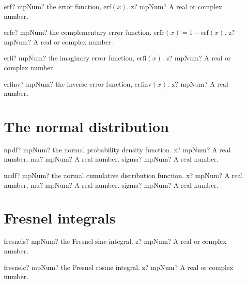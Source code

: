 \documentclass[12pt,a4paper,openany]{book}
\begin{document}
\begin{mpFunctionsExtract}
\mpFunctionOne
{erf? mpNum? the error function, $\text{erf}(x)$.}
{z? mpNum? A real or complex number.}
\end{mpFunctionsExtract}

\begin{mpFunctionsExtract}
\mpFunctionOne
{erfc? mpNum? the complementary error function, $\text{erfc}(x)=1-\text{erf}(x)$.}
{z? mpNum? A real or complex number.}
\end{mpFunctionsExtract}

\begin{mpFunctionsExtract}
\mpFunctionOne
{erfi? mpNum? the imaginary error function, $\text{erfi}(x)$.}
{z? mpNum? A real or complex number.}
\end{mpFunctionsExtract}

\begin{mpFunctionsExtract}
\mpFunctionOne
{erfinv? mpNum? the inverse error function, $\text{erfinv}(x)$.}
{x? mpNum? A real number.}
\end{mpFunctionsExtract}

\section{The normal distribution}

\begin{mpFunctionsExtract}
\mpFunctionThree
{npdf? mpNum? the normal probability density function.}
{x? mpNum? A real number.}
{mu? mpNum? A real number.}
{sigma? mpNum? A real number.}
\end{mpFunctionsExtract}

\begin{mpFunctionsExtract}
\mpFunctionThree
{ncdf? mpNum? the normal cumulative distribution function.}
{x? mpNum? A real number.}
{mu? mpNum? A real number.}
{sigma? mpNum? A real number.}
\end{mpFunctionsExtract}

\section{Fresnel integrals}

\begin{mpFunctionsExtract}
\mpFunctionOne
{fresnels? mpNum? the Fresnel sine integral.}
{z? mpNum? A real or complex number.}
\end{mpFunctionsExtract}

\begin{mpFunctionsExtract}
\mpFunctionOne
{fresnelc? mpNum? the Fresnel cosine integral.}
{z? mpNum? A real or complex number.}
\end{mpFunctionsExtract}
\end{document}
